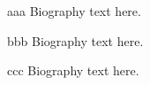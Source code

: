 \documentclass[journal]{IEEEtran}
\begin{document}



\begin{IEEEbiography}{aaa}
Biography text here.
\end{IEEEbiography}

\begin{IEEEbiography}{bbb}
Biography text here.
\end{IEEEbiography}


\begin{IEEEbiography}{ccc}
Biography text here.
\end{IEEEbiography}
\end{document}
